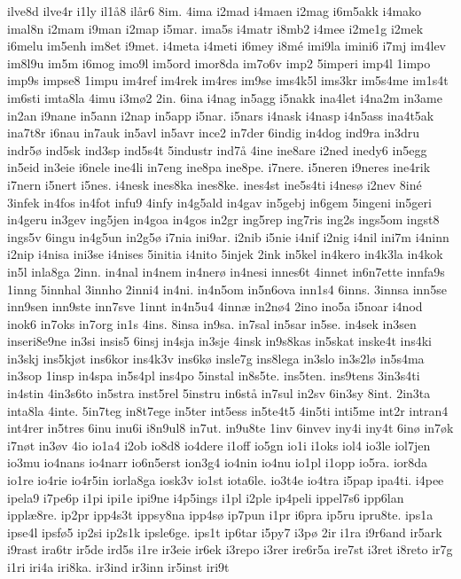{ilve8d
ilve4r
i1ly
il1å8
ilår6
8im.
4ima
i2mad
i4maen
i2mag
i6m5akk
i4mako
imal8n
i2mam
i9man
i2map
i5mar.
ima5s
i4matr
i8mb2
i4mee
i2me1g
i2mek
i6melu
im5enh
im8et
i9met.
i4meta
i4meti
i6mey
i8mé
imi9la
imini6
i7mj
im4lev
im8l9u
im5m
i6mog
imo9l
im5ord
imor8da
im7o6v
imp2
5imperi
imp4l
1impo
imp9s
impse8
1impu
im4ref
im4rek
im4res
im9se
ims4k5l
ims3kr
im5s4me
im1s4t
im6sti
imta8la
4imu
i3mø2
2in.
6ina
i4nag
in5agg
i5nakk
ina4let
i4na2m
in3ame
in2an
i9nane
in5ann
i2nap
in5app
i5nar.
i5nars
i4nask
i4nasp
i4n5ass
ina4t5ak
ina7t8r
i6nau
in7auk
in5avl
in5avr
ince2
in7der
6indig
in4dog
ind9ra
in3dru
indr5ø
ind5sk
ind3sp
ind5s4t
5industr
ind7å
4ine
ine8are
i2ned
inedy6
in5egg
in5eid
in3eie
i6nele
ine4li
in7eng
ine8pa
ine8pe.
i7nere.
i5neren
i9neres
ine4rik
i7nern
i5nert
i5nes.
i4nesk
ines8ka
ines8ke.
ines4st
ine5s4ti
i4nesø
i2nev
8iné
3infek
in4fos
in4fot
infu9
4infy
in4g5ald
in4gav
in5gebj
in6gem
5ingeni
in5geri
in4geru
in3gev
ing5jen
in4goa
in4gos
in2gr
ing5rep
ing7ris
ing2s
ings5om
ingst8
ings5v
6ingu
in4g5un
in2g5ø
i7nia
ini9ar.
i2nib
i5nie
i4nif
i2nig
i4nil
ini7m
i4ninn
i2nip
i4nisa
ini3se
i4nises
5initia
i4nito
5injek
2ink
in5kel
in4kero
in4k3la
in4kok
in5l
inla8ga
2inn.
in4nal
in4nem
in4nerø
in4nesi
innes6t
4innet
in6n7ette
innfa9s
1inng
5innhal
3innho
2inni4
in4ni.
in4n5om
in5n6ova
inn1s4
6inns.
3innsa
inn5se
inn9sen
inn9ste
inn7sve
1innt
in4n5u4
4innæ
in2nø4
2ino
ino5a
i5noar
i4nod
inok6
in7oks
in7org
in1s
4ins.
8insa
in9sa.
in7sal
in5sar
in5se.
in4sek
in3sen
inseri8e9ne
in3si
insis5
6insj
in4sja
in3sje
4insk
in9s8kas
in5skat
inske4t
ins4ki
in3skj
ins5kjøt
ins6kor
ins4k3v
ins6kø
insle7g
ins8lega
in3slo
in3s2lø
in5s4ma
in3sop
1insp
in4spa
in5s4pl
ins4po
5instal
in8s5te.
ins5ten.
ins9tens
3in3s4ti
in4stin
4in3s6to
in5stra
inst5rel
5instru
in6stå
in7sul
in2sv
6in3sy
8int.
2in3ta
inta8la
4inte.
5in7teg
in8t7ege
in5ter
int5ess
in5te4t5
4in5ti
inti5me
int2r
intran4
int4rer
in5tres
6inu
inu6i
i8n9ul8
in7ut.
in9u8te
1inv
6invev
iny4i
iny4t
6inø
in7øk
i7nøt
in3øv
4io
io1a4
i2ob
io8d8
io4dere
i1off
io5gn
io1i
i1oks
iol4
io3le
iol7jen
io3mu
io4nans
io4narr
io6n5erst
ion3g4
io4nin
io4nu
io1pl
i1opp
io5ra.
ior8da
io1re
io4rie
io4r5in
iorla8ga
iosk3v
io1st
iota6le.
io3t4e
io4tra
i5pap
ipa4ti.
i4pee
ipela9
i7pe6p
i1pi
ipi1e
ipi9ne
i4p5ings
i1pl
i2ple
ip4peli
ippel7s6
ipp6lan
ipplæ8re.
ip2pr
ipp4s3t
ippsy8na
ipp4sø
ip7pun
i1pr
i6pra
ip5ru
ipru8te.
ips1a
ipse4l
ipsfø5
ip2si
ip2s1k
ipsle6ge.
ips1t
ip6tar
i5py7
i3pø
2ir
i1ra
i9r6and
ir5ark
i9rast
ira6tr
ir5de
ird5s
i1re
ir3eie
ir6ek
i3repo
i3rer
ire6r5a
ire7st
i3ret
i8reto
ir7g
i1ri
iri4a
iri8ka.
ir3ind
ir3inn
ir5inst
iri9t
}
